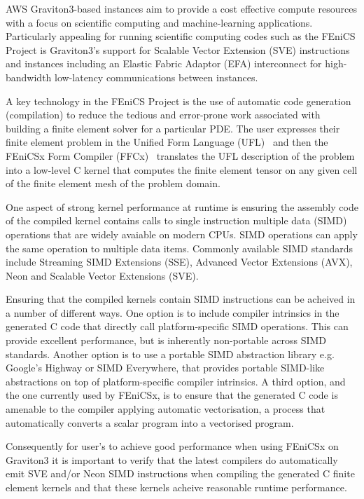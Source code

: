 AWS Graviton3-based instances aim to provide a cost effective compute resources
with a focus on scientific computing and machine-learning applications.
Particularly appealing for running scientific computing codes such as the
FEniCS Project is Graviton3's support for Scalable Vector Extension (SVE)
instructions and instances including an Elastic Fabric Adaptor (EFA)
interconnect for high-bandwidth low-latency communications between instances.

A key technology in the FEniCS Project is the use of automatic code generation
(compilation) to reduce the tedious and error-prone work associated with
building a finite element solver for a particular PDE. The user expresses their
finite element problem in the Unified Form Language
(UFL)~\citep{alnaes_unified_2014} and then the FEniCSx Form Compiler
(FFCx)~\citep{kirby_compiler_2006} translates the UFL description of the problem
into a low-level C kernel that computes the finite element tensor on any given
cell of the finite element mesh of the problem domain.

One aspect of strong kernel performance at runtime is ensuring the assembly
code of the compiled kernel contains calls to single instruction multiple data
(SIMD) operations that are widely avaiable on modern CPUs. SIMD operations can
apply the same operation to multiple data items. Commonly available SIMD
standards include Streaming SIMD Extensions (SSE), Advanced Vector Extensions
(AVX), Neon and Scalable Vector Extensions (SVE). 

Ensuring that the compiled kernels contain SIMD instructions can be acheived in
a number of different ways. One option is to include compiler intrinsics in the
generated C code that directly call platform-specific SIMD operations. This can
provide excellent performance, but is inherently non-portable across SIMD
standards. Another option is to use a portable SIMD abstraction library e.g.
Google's Highway or SIMD Everywhere, that provides portable SIMD-like
abstractions on top of platform-specific compiler intrinsics. A third option,
and the one currently used by FEniCSx, is to ensure that the generated C code
is amenable to the compiler applying automatic vectorisation, a process that
automatically converts a scalar program into a vectorised program.
 
Consequently for user's to achieve good performance when using FEniCSx on
Graviton3 it is important to verify that the latest compilers do automatically
emit SVE and/or Neon SIMD instructions when compiling the generated C finite
element kernels and that these kernels acheive reasonable runtime performance. 

